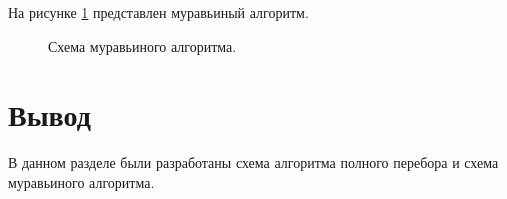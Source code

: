 На рисунке \ref{fig:Ant} представлен муравьиный алгоритм. 
\begin{figure}[H]
	\caption{Схема муравьиного алгоритма.}
	\label{fig:Ant}
\end{figure}

\section*{Вывод}
В данном разделе были разработаны схема алгоритма полного перебора и схема муравьиного алгоритма.

